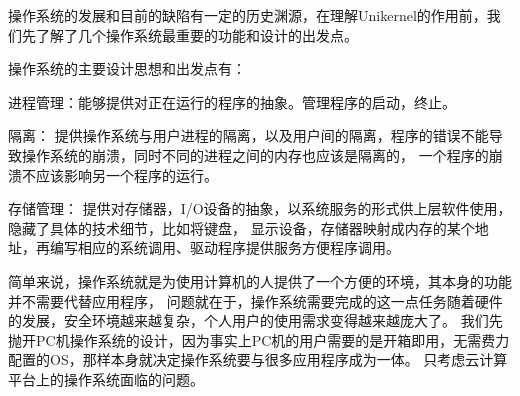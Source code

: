 \documentclass[fontsize=13pt, %
    paper=a4, %
    twoside, %
    captions=tableheading,
    index=totoc,
    hyperref]{labbook}
\begin{document}
\begin{spacing}{1.0}


\title{}

\author{
\\ \\ %
ZOO小组 %
}
\date{\today}

\maketitle %

\printindex

\tableofcontents %
\newpage %

\begin{addmargin}[4cm]{0cm} %

\pagestyle{scrheadings} %



操作系统的发展和目前的缺陷有一定的历史渊源，在理解Unikernel的作用前，我们先了解了几个操作系统最重要的功能和设计的出发点。

操作系统的主要设计思想和出发点有：

进程管理：能够提供对正在运行的程序的抽象。管理程序的启动，终止。

隔离： 提供操作系统与用户进程的隔离，以及用户间的隔离，程序的错误不能导致操作系统的崩溃，同时不同的进程之间的内存也应该是隔离的，
一个程序的崩溃不应该影响另一个程序的运行。

存储管理： 提供对存储器，I/O设备的抽象，以系统服务的形式供上层软件使用，隐藏了具体的技术细节，比如将键盘，
显示设备，存储器映射成内存的某个地址，再编写相应的系统调用、驱动程序提供服务方便程序调用。

简单来说，操作系统就是为使用计算机的人提供了一个方便的环境，其本身的功能并不需要代替应用程序，
问题就在于，操作系统需要完成的这一点任务随着硬件的发展，安全环境越来越复杂，个人用户的使用需求变得越来越庞大了。
我们先抛开PC机操作系统的设计，因为事实上PC机的用户需要的是开箱即用，无需费力配置的OS，那样本身就决定操作系统要与很多应用程序成为一体。
只考虑云计算平台上的操作系统面临的问题。


\end{addmargin}
\end{spacing}
\end{document}
